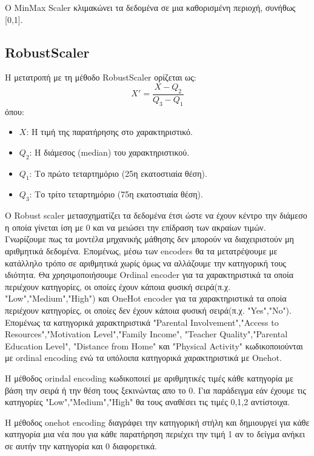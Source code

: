 \documentclass[12pt]{article}
\begin{document}
\noindent Ο MinMax Scaler κλιμακώνει τα δεδομένα σε μια καθορισμένη περιοχή, συνήθως [0,1].



\subsection*{RobustScaler}
Η μετατροπή με τη μέθοδο RobustScaler ορίζεται ως:
\[
X' = \frac{X - Q_2}{Q_3 - Q_1}
\]
όπου:
\begin{itemize}
    \item \( X \): Η τιμή της παρατήρησης στο χαρακτηριστικό.
    \item \( Q_2 \): Η διάμεσος (median) του χαρακτηριστικού.
    \item \( Q_1 \): Το πρώτο τεταρτημόριο (25η εκατοστιαία θέση).
    \item \( Q_3 \): Το τρίτο τεταρτημόριο (75η εκατοστιαία θέση).\\
\end{itemize}

\noindent Ο Robust scaler μετασχηματίζει τα δεδομένα έτσι ώστε να έχουν κέντρο την διάμεσο η οποία γίνεται ίση με 0 και να μειώσει την επίδραση των ακραίων τιμών.\\

\noindent Γνωρίζουμε πως τα μοντέλα μηχανικής μάθησης δεν μπορούν να διαχειριστούν μη αριθμητικά δεδομένα. Επομένως, μέσω των encoders θα τα μετατρέψουμε με κατάλληλο τρόπο σε αριθμητικά χωρίς όμως να αλλάζουμε την κατηγορική τους ιδιότητα. Θα χρησιμοποιήσουμε Ordinal encoder για τα χαρακτηριστικά τα οποία περιέχουν κατηγορίες, οι οποίες έχουν κάποια φυσική σειρά(π.χ. "Low","Medium","High") και OneHot encoder για τα χαρακτηριστικά τα οποία περιέχουν κατηγορίες, οι οποίες δεν έχουν κάποια φυσική σειρά(π.χ. "Yes","No"). Επομένως τα κατηγορικά χαρακτηριστικά "Parental Involvement","Access to Resources","Motivation Level","Family Income", "Teacher Quality","Parental Education Level", "Distance from Home" και "Physical Activity" κωδικοποιούνται με ordinal encoding ενώ τα υπόλοιπα κατηγορικά χαρακτηριστικά με Onehot.

Η μέθοδος orindal encoding κωδικοποιεί με αριθμητικές τιμές κάθε κατηγορία με βάση την σειρά ή την θέση τους ξεκινώντας απο το 0. Για παράδειγμα εάν έχουμε τις κατηγορίες "Low","Medium","High" θα τους αναθέσει τις τιμές 0,1,2 αντίστοιχα. 

Η μέθοδος onehot encoding διαγράφει την κατηγορική στήλη και δημιουργεί για κάθε κατηγορία μια νέα που για κάθε παρατήρηση περιέχει την τιμή 1 αν το δείγμα ανήκει σε αυτήν την κατηγορία και 0 διαφορετικά. 
\end{document}
